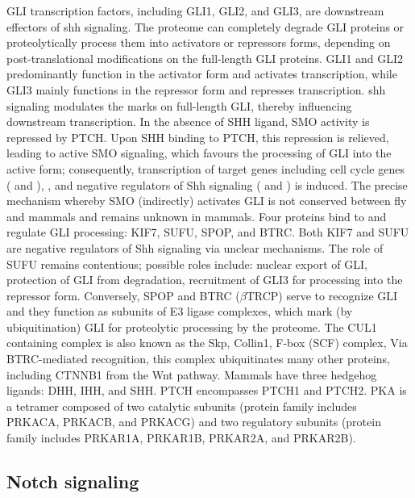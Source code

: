 		GLI transcription factors, including GLI1, GLI2, and GLI3, are downstream effectors of \gls{shh} signaling. The proteome can completely degrade GLI proteins or proteolytically process them into activators or repressors forms, depending on post-translational modifications on the full-length GLI proteins. GLI1 and GLI2 predominantly function in the activator form and activates transcription, while GLI3 mainly functions in the repressor form and represses transcription. \gls{shh} signaling modulates the marks on full-length GLI, thereby influencing downstream transcription.
		In the absence of SHH ligand, SMO activity is repressed by PTCH. Upon SHH binding to PTCH, this repression is relieved, leading to active SMO signaling, which favours the processing of GLI into the active form; consequently, transcription of target genes including cell cycle genes ( and ), , and negative regulators of Shh signaling ( and ) is induced.
		The precise mechanism whereby SMO (indirectly) activates GLI is not conserved between fly and mammals and remains unknown in mammals. Four proteins bind to and regulate GLI processing: KIF7, SUFU, SPOP, and BTRC. Both KIF7 and SUFU are negative regulators of Shh signaling via unclear mechanisms. The role of SUFU remains contentious; possible roles include: nuclear export of GLI, protection of GLI from degradation, recruitment of GLI3 for processing into the repressor form. Conversely, SPOP and BTRC ($\beta$TRCP) serve to recognize GLI and they function as subunits of E3 ligase complexes, which mark (by ubiquitination) GLI for proteolytic processing by the proteome. The CUL1 containing complex is also known as the Skp, Collin1, F-box (SCF) complex, Via BTRC-mediated recognition, this complex ubiquitinates many other proteins, including CTNNB1 from the Wnt pathway.
		Mammals have three hedgehog ligands: DHH, IHH, and SHH. PTCH encompasses PTCH1 and PTCH2. PKA is a tetramer composed of two catalytic subunits (protein family includes PRKACA, PRKACB, and PRKACG) and two regulatory subunits (protein family includes PRKAR1A, PRKAR1B, PRKAR2A, and PRKAR2B).


\subsection{Notch signaling}

